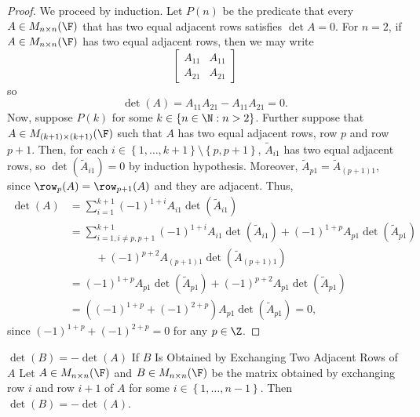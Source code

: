 \documentclass[linearalgebra]{subfiles}
\begin{document}
    \begin{proof}
        We proceed by induction. Let $P(n)$ be the predicate that every $A\in M_{n\times n}(\F)$ that has two equal adjacent rows satisfies $\det A = 0$. For $n=2$, if $A\in M_{n\times n}(\F)$ has two equal adjacent rows, then we may write
        \begin{equation*}
            \begin{bmatrix}
                A_{11} & A_{11} \\ A_{21} & A_{21}
            \end{bmatrix}
        \end{equation*}
        so
        \begin{equation*}
            \det(A) = A_{11}A_{21} - A_{11}A_{21} = 0.
        \end{equation*}
        Now, suppose $P(k)$ for some $k\in \left\lbrace n\in \N: n>2 \right\rbrace$. Further suppose that $A\in M_{(k+1)\times (k+1)}(\F)$ such that $A$ has two equal adjacent rows, row $p$ and row $p+1$. Then, for each $i\in \left\lbrace 1, \ldots, k+1 \right\rbrace\setminus \left\lbrace p, p+1 \right\rbrace$, $\widetilde{A}_{i1}$ has two equal adjacent rows, so $\det\left( \widetilde{A}_{i1}\right) = 0$ by induction hypothesis. Moreover, $\widetilde{A}_{p1} = \widetilde{A}_{(p+1)1}$, since $\row_p(A) = \row_{p+1}(A)$ and they are adjacent. Thus,
        \begin{align*}
            \det(A) & = \sum^{k+1}_{i=1} (-1)^{1+i} A_{i1} \det \left(\widetilde{A}_{i1}\right) \\
                    & = \sum^{k+1}_{i=1, i\neq p, p+1} (-1)^{1+i} A_{i1} \det \left(\widetilde{A}_{i1}\right) + (-1)^{1+p}A_{p1} \det \left(\widetilde{A}_{p1}\right) \\
                    & \hspace{1cm} + (-1)^{p+2}A_{(p+1)1} \det \left(\widetilde{A}_{(p+1)1}\right) \\
                    & = (-1)^{1+p}A_{p1} \det \left(\widetilde{A}_{p1}\right) + (-1)^{p+2}A_{p1} \det \left(\widetilde{A}_{p1}\right) \\
                    & = \left( (-1)^{1+p} + (-1)^{2+p} \right)  A_{p1} \det \left(\widetilde{A}_{p1}\right) = 0,
        \end{align*} 
        since $(-1)^{1+p} + (-1)^{2+p} = 0$ for any $p\in \Z$.
    \end{proof}
        
    \begin{lemma}{$\det(B) = -\det(A)$ If $B$ Is Obtained by Exchanging Two Adjacent Rows of $A$}
        Let $A\in M_{n\times n}(\F)$ and $B\in M_{n\times n}(\F)$ be the matrix obtained by exchanging row $i$ and row $i+1$ of $A$ for some $i\in \left\lbrace 1, \ldots, n-1 \right\rbrace$. Then $\det(B) = -\det(A)$.
    \end{lemma}
\end{document}
